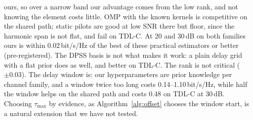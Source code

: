 \documentclass[conference,10pt]{IEEEtran}
\theoremstyle{remark}
\begin{document}
ours, so over a narrow band our advantage comes from the low rank, and not knowing the element costs little. OMP with the
known kernels is competitive on the shared path; static pilots are good at low SNR there but floor, since the harmonic span
is not flat, and fail on TDL-C. At 20 and 30\,dB on both families ours is within 0.02\,bit/s/Hz of the best of these
practical estimators or better (pre-registered). The DPSS basis is not what makes it work: a plain delay grid with a flat
prior does as well, and better on TDL-C. The rank is not critical ($\pm0.03$). The delay window is: our hyperparameters
are prior knowledge per channel family, and a window twice too long costs 0.14--1.10\,bit/s/Hz, while half the window helps
on the shared path and costs 0.48 on TDL-C at 30\,dB. Choosing $\tau_{\max}$ by evidence, as Algorithm~\ref{alg:offset}
chooses the window start, is a natural extension that we have not tested.
\end{document}
